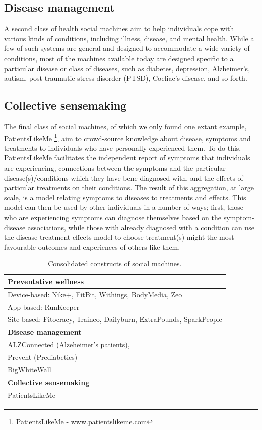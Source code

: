 \documentclass{sig-alternate}
\begin{document}
\subsection{Disease management}

A second class of health social machines aim to help individuals cope
with various kinds of conditions, including illness, disease, and
mental health.  While a few of such systems are general and designed
to accommodate a wide variety of conditions, most of the machines
available today are designed specific to a particular disease or class
of diseases, such as diabetes, depression, Alzheimer's, autism,
post-traumatic stress disorder (PTSD), Coeliac's disease, and so
forth.

\subsection{Collective sensemaking}

The final class of social machines, of which we only found one extant
example, PatientsLikeMe \footnote{PatientsLikeMe -
  \url{www.patientslikeme.com}}, aim to crowd-source knowledge about
disease, symptoms and treatments to individuals who have personally
experienced them.  To do this, PatientsLikeMe facilitates the
independent report of symptoms that individuals are experiencing,
connections between the symptoms and the particular
disease(s)/conditions which they have bene diagnosed with, and the
effects of particular treatments on their conditions.  The result of
this aggregation, at large scale, is a model relating symptoms to
diseases to treatments and effects.  This model can then be used by
other individuals in a number of ways; first, those who are
experiencing symptoms can diagnose themselves based on the
symptom-disease associations, while those with already diagnosed with
a condition can use the disease-treatment-effects model to choose
treatment(s) might the most favourable outcomes and experiences of
others like them.

\begin{table}[htb]
\begin{center}
\begin{tabular}{|p{8cm}|}
\hline
{\bf Preventative wellness} \\
\hline
Device-based: Nike+, FitBit, Withings, BodyMedia, Zeo \\
App-based: RunKeeper \\
Site-based: Fitocracy, Traineo, Dailyburn, ExtraPounds, SparkPeople  \\
\hline
{\bf Disease management} \\
\hline
ALZConnected (Alzeheimer's patients),  \\
Prevent (Prediabetics) \\
BigWhiteWall \\
\hline
{\bf Collective sensemaking} \\
PatientsLikeMe \\
\hline
\end{tabular}
\end{center}
\caption{Consolidated constructs of social machines.} \label{table:clusters}
\end{table}
\end{document}

